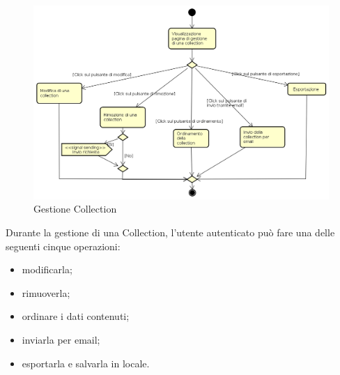 \begin{figure}[H]
\begin{center}
\includegraphics[width=16cm]{res/sections/backend/activities/gestioneCollection.png}
\caption{Gestione Collection}
\end{center}
\end{figure}
Durante la gestione di una Collection, l'utente autenticato può fare una delle seguenti cinque operazioni:
\begin{itemize}
\item modificarla;
\item rimuoverla;
\item ordinare i dati contenuti;
\item inviarla per email;
\item esportarla e salvarla in locale.
\end{itemize}

